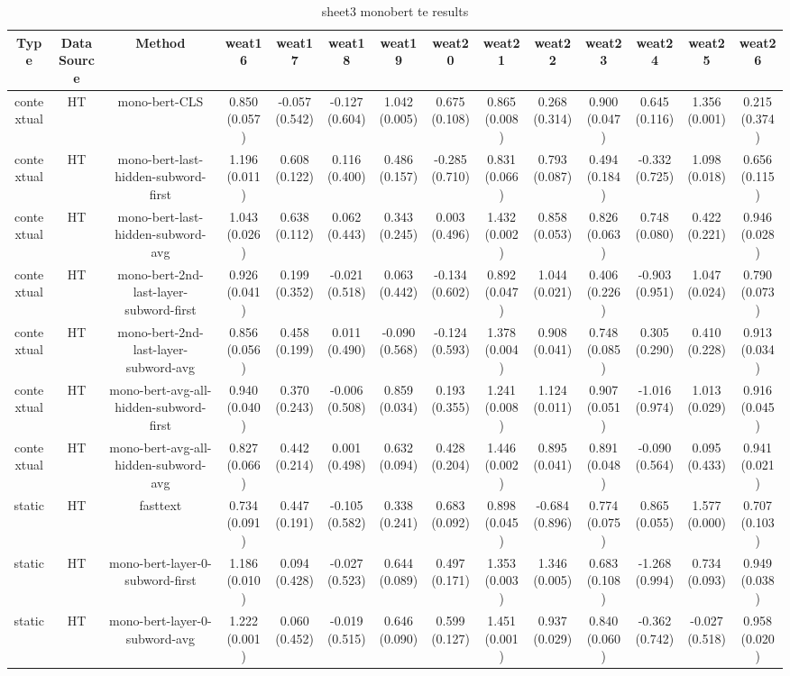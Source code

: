 \begin{sidewaystable}[htb]
    \centering
    \caption{sheet3 monobert te results}
    \label{appendix_tab:sheet3_monobert_te_results}
    \small
    \begin{tabular}{@{}cccccccccccccc@{}}
        \toprule
        Type & DataSource & Method & weat16 & weat17 & weat18 & weat19 & weat20 & weat21 & weat22 & weat23 & weat24 & weat25 & weat26 \\
        \midrule
        contextual & HT & mono-bert-CLS & 0.850 (0.057) & -0.057 (0.542) & -0.127 (0.604) & 1.042 (0.005) & 0.675 (0.108) & 0.865 (0.008) & 0.268 (0.314) & 0.900 (0.047) & 0.645 (0.116) & 1.356 (0.001) & 0.215 (0.374) \\
        contextual & HT & mono-bert-last-hidden-subword-first & 1.196 (0.011) & 0.608 (0.122) & 0.116 (0.400) & 0.486 (0.157) & -0.285 (0.710) & 0.831 (0.066) & 0.793 (0.087) & 0.494 (0.184) & -0.332 (0.725) & 1.098 (0.018) & 0.656 (0.115) \\
        contextual & HT & mono-bert-last-hidden-subword-avg & 1.043 (0.026) & 0.638 (0.112) & 0.062 (0.443) & 0.343 (0.245) & 0.003 (0.496) & 1.432 (0.002) & 0.858 (0.053) & 0.826 (0.063) & 0.748 (0.080) & 0.422 (0.221) & 0.946 (0.028) \\
        contextual & HT & mono-bert-2nd-last-layer-subword-first & 0.926 (0.041) & 0.199 (0.352) & -0.021 (0.518) & 0.063 (0.442) & -0.134 (0.602) & 0.892 (0.047) & 1.044 (0.021) & 0.406 (0.226) & -0.903 (0.951) & 1.047 (0.024) & 0.790 (0.073) \\
        contextual & HT & mono-bert-2nd-last-layer-subword-avg & 0.856 (0.056) & 0.458 (0.199) & 0.011 (0.490) & -0.090 (0.568) & -0.124 (0.593) & 1.378 (0.004) & 0.908 (0.041) & 0.748 (0.085) & 0.305 (0.290) & 0.410 (0.228) & 0.913 (0.034) \\
        contextual & HT & mono-bert-avg-all-hidden-subword-first & 0.940 (0.040) & 0.370 (0.243) & -0.006 (0.508) & 0.859 (0.034) & 0.193 (0.355) & 1.241 (0.008) & 1.124 (0.011) & 0.907 (0.051) & -1.016 (0.974) & 1.013 (0.029) & 0.916 (0.045) \\
        contextual & HT & mono-bert-avg-all-hidden-subword-avg & 0.827 (0.066) & 0.442 (0.214) & 0.001 (0.498) & 0.632 (0.094) & 0.428 (0.204) & 1.446 (0.002) & 0.895 (0.041) & 0.891 (0.048) & -0.090 (0.564) & 0.095 (0.433) & 0.941 (0.021) \\
        static & HT & fasttext & 0.734 (0.091) & 0.447 (0.191) & -0.105 (0.582) & 0.338 (0.241) & 0.683 (0.092) & 0.898 (0.045) & -0.684 (0.896) & 0.774 (0.075) & 0.865 (0.055) & 1.577 (0.000) & 0.707 (0.103) \\
        static & HT & mono-bert-layer-0-subword-first & 1.186 (0.010) & 0.094 (0.428) & -0.027 (0.523) & 0.644 (0.089) & 0.497 (0.171) & 1.353 (0.003) & 1.346 (0.005) & 0.683 (0.108) & -1.268 (0.994) & 0.734 (0.093) & 0.949 (0.038) \\
        static & HT & mono-bert-layer-0-subword-avg & 1.222 (0.001) & 0.060 (0.452) & -0.019 (0.515) & 0.646 (0.090) & 0.599 (0.127) & 1.451 (0.001) & 0.937 (0.029) & 0.840 (0.060) & -0.362 (0.742) & -0.027 (0.518) & 0.958 (0.020) \\
        \bottomrule
    \end{tabular}
\end{sidewaystable}